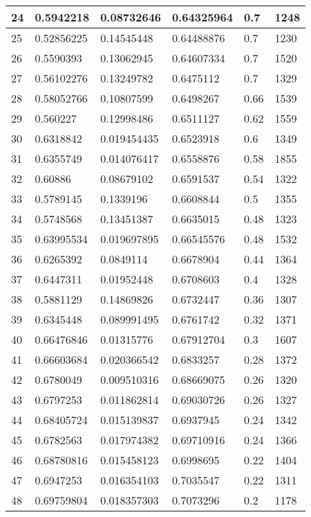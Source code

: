 \begin{longtable}{|l|l|l|l|l|l|}
24 & 0.5942218 & 0.08732646 & 0.64325964 & 0.7 & 1248 \\ \hline 
25 & 0.52856225 & 0.14545448 & 0.64488876 & 0.7 & 1230 \\ \hline 
26 & 0.5590393 & 0.13062945 & 0.64607334 & 0.7 & 1520 \\ \hline 
27 & 0.56102276 & 0.13249782 & 0.6475112 & 0.7 & 1329 \\ \hline 
28 & 0.58052766 & 0.10807599 & 0.6498267 & 0.66 & 1539 \\ \hline 
29 & 0.560227 & 0.12998486 & 0.6511127 & 0.62 & 1559 \\ \hline 
30 & 0.6318842 & 0.019454435 & 0.6523918 & 0.6 & 1349 \\ \hline 
31 & 0.6355749 & 0.014076417 & 0.6558876 & 0.58 & 1855 \\ \hline 
32 & 0.60886 & 0.08679102 & 0.6591537 & 0.54 & 1322 \\ \hline 
33 & 0.5789145 & 0.1339196 & 0.6608844 & 0.5 & 1355 \\ \hline 
34 & 0.5748568 & 0.13451387 & 0.6635015 & 0.48 & 1323 \\ \hline 
35 & 0.63995534 & 0.019697895 & 0.66545576 & 0.48 & 1532 \\ \hline 
36 & 0.6265392 & 0.0849114 & 0.6678904 & 0.44 & 1364 \\ \hline 
37 & 0.6447311 & 0.01952448 & 0.6708603 & 0.4 & 1328 \\ \hline 
38 & 0.5881129 & 0.14869826 & 0.6732447 & 0.36 & 1307 \\ \hline 
39 & 0.6345448 & 0.089991495 & 0.6761742 & 0.32 & 1371 \\ \hline 
40 & 0.66476846 & 0.01315776 & 0.67912704 & 0.3 & 1607 \\ \hline 
41 & 0.66603684 & 0.020366542 & 0.6833257 & 0.28 & 1372 \\ \hline 
42 & 0.6780049 & 0.009510316 & 0.68669075 & 0.26 & 1320 \\ \hline 
43 & 0.6797253 & 0.011862814 & 0.69030726 & 0.26 & 1327 \\ \hline 
44 & 0.68405724 & 0.015139837 & 0.6937945 & 0.24 & 1342 \\ \hline 
45 & 0.6782563 & 0.017974382 & 0.69710916 & 0.24 & 1366 \\ \hline 
46 & 0.68780816 & 0.015458123 & 0.6998695 & 0.22 & 1404 \\ \hline 
47 & 0.6947253 & 0.016354103 & 0.7035547 & 0.22 & 1311 \\ \hline 
48 & 0.69759804 & 0.018357303 & 0.7073296 & 0.2 & 1178 \\ \hline 

\end{longtable}
